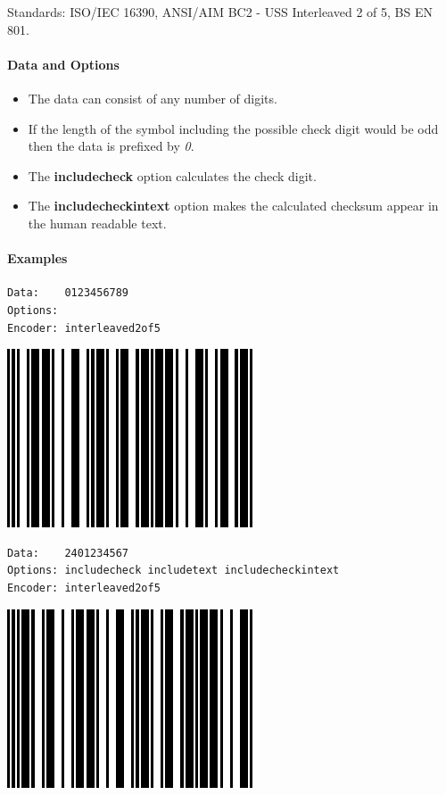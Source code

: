 Standards: ISO/IEC 16390, ANSI/AIM BC2 - USS Interleaved 2 of 5, BS EN
801.

\hypertarget{data-and-options-24}{%
\paragraph{Data and Options}\label{data-and-options-24}}

\begin{itemize}
\tightlist
\item
  The data can consist of any number of digits.
\item
  If the length of the symbol including the possible check digit would
  be odd then the data is prefixed by \emph{0}.
\item
  The \textbf{includecheck} option calculates the check digit.
\item
  The \textbf{includecheckintext} option makes the calculated checksum
  appear in the human readable text.
\end{itemize}

\hypertarget{examples-19}{%
\paragraph{Examples}\label{examples-19}}

\begin{verbatim}
Data:    0123456789
Options: 
Encoder: interleaved2of5
\end{verbatim}

\includegraphics{images/itf-1.eps}

\begin{verbatim}
Data:    2401234567
Options: includecheck includetext includecheckintext
Encoder: interleaved2of5
\end{verbatim}

\includegraphics{images/itf-2.eps}

